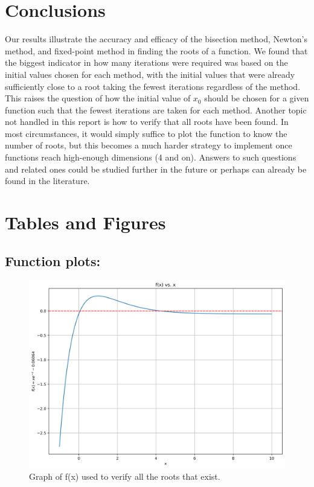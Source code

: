 \documentclass[11pt]{article}
\begin{document}
\section{Conclusions}

Our results illustrate the accuracy and efficacy of the bisection method, Newton's method, and fixed-point method in finding the roots of a function. We found that the biggest indicator in how many iterations were required was based on the initial values chosen for each method, with the initial values that were already sufficiently close to a root taking the fewest iterations regardless of the method. This raises the question of how the initial value of $x_0$ should be chosen for a given function such that the fewest iterations are taken for each method. Another topic not handled in this report is how to verify that all roots have been found. In most circumstances, it would simply suffice to plot the function to know the number of roots, but this becomes a much harder strategy to implement once functions reach high-enough dimensions (4 and on). Answers to such questions and related ones could be studied further in the future or perhaps can already be found in the literature.

\clearpage
\section{Tables and Figures}
\subsection{Function plots:}
\begin{figure}[H]
	\centering
	\includegraphics[width=\linewidth]{../figures/f(x)}
	\caption{Graph of f(x) used to verify all the roots that exist.}
	\label{fig:f(x)}
\end{figure}
\end{document}
